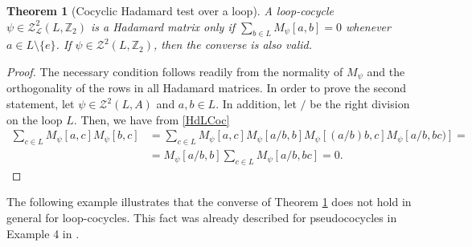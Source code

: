 \documentclass[11pt,a4paper]{article}
\newtheorem{theorem}{Theorem}[section]
\begin{document}
\begin{theorem}[Cocyclic Hadamard test over a loop]\label{theo_CocHadTest} A loop-cocycle $\psi\in \mathcal{Z}_{\mathcal{L}}^2(L,\mathbb{Z}_2)$ is a Hadamard matrix only if $\sum_{b\in  L} M_\psi[a,b]=0$ whenever $a\in L\setminus\{e\}$. If $\psi\in \mathcal{Z}^2(L,\mathbb{Z}_2)$, then the converse is also valid.
\end{theorem}

\begin{proof} The necessary condition follows readily from the normality of $M_{\psi}$ and the orthogonality of the rows in all Hadamard matrices. In order to prove the second statement, let $\psi\in \mathcal{Z}^2(L,A)$ and $a,b\in L$. In addition, let $/$ be the right division on the loop $L$. Then, we have from \eqref{HdLCoc}
\begin{align*}
\sum_{c\in L}M_\psi[a,c]M_\psi[b,c] & = \sum_{c\in L}M_\psi[a,c]M_\psi[a/b,b]M_\psi[(a/b)b,c]M_\psi[a/b,bc)]=\\
& = M_\psi[a/b,b]\sum_{c\in L}M_\psi[a/b,bc]=0.
\end{align*}
\end{proof}

The following example illustrates that the converse of Theorem \ref{theo_CocHadTest} does not hold in general for loop-cocycles. This fact was already described for pseudococycles in Example 4 in \citep{Alvarez2020}.
\end{document}
